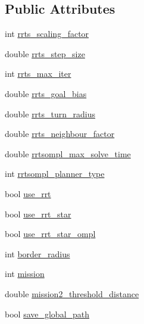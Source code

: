 \subsection*{Public Attributes}
\begin{DoxyCompactItemize}
\item 
int \hyperlink{classconfig__Params__planPath_a26329f440ce13957ff4c7fb643b66ced}{rrts\+\_\+scaling\+\_\+factor}
\item 
double \hyperlink{classconfig__Params__planPath_a5d43faedc443b4ff25dc2fd5fd27b2dd}{rrts\+\_\+step\+\_\+size}
\item 
int \hyperlink{classconfig__Params__planPath_ade92a1a5f3d29658d460057219f80486}{rrts\+\_\+max\+\_\+iter}
\item 
double \hyperlink{classconfig__Params__planPath_ab021000cd2770f4f9202396dda3aeff7}{rrts\+\_\+goal\+\_\+bias}
\item 
double \hyperlink{classconfig__Params__planPath_af0f84d366ab29443178fb55aa80ac23b}{rrts\+\_\+turn\+\_\+radius}
\item 
double \hyperlink{classconfig__Params__planPath_ab71b5c9e559f89ddea075e8012499d18}{rrts\+\_\+neighbour\+\_\+factor}
\item 
double \hyperlink{classconfig__Params__planPath_aeb42cb9ee0112f1bdee15ff8d5808958}{rrtsompl\+\_\+max\+\_\+solve\+\_\+time}
\item 
int \hyperlink{classconfig__Params__planPath_afee977505c0e321629da095f9f0f91af}{rrtsompl\+\_\+planner\+\_\+type}
\item 
bool \hyperlink{classconfig__Params__planPath_ad95f059b3b5a19b938a4b4bcbff73eab}{use\+\_\+rrt}
\item 
bool \hyperlink{classconfig__Params__planPath_a88d2ed829eea295da08035b2e337a034}{use\+\_\+rrt\+\_\+star}
\item 
bool \hyperlink{classconfig__Params__planPath_a75a7e08f13b232240c5e6a226e34f333}{use\+\_\+rrt\+\_\+star\+\_\+ompl}
\item 
int \hyperlink{classconfig__Params__planPath_a43c04821b004c31011e72c10a250b942}{border\+\_\+radius}
\item 
int \hyperlink{classconfig__Params__planPath_a8d467a6cae6f3afb4d3a628ea7ffa81c}{mission}
\item 
double \hyperlink{classconfig__Params__planPath_a4cde1927f911cd41b43b66668dda3ec9}{mission2\+\_\+threshold\+\_\+distance}
\item 
bool \hyperlink{classconfig__Params__planPath_a6ec518fae1a865e277b6807e87cd71b2}{save\+\_\+global\+\_\+path}
\item 

\end{DoxyCompactItemize}
